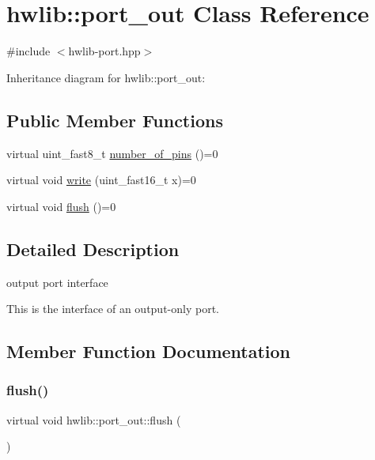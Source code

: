 \hypertarget{classhwlib_1_1port__out}{}\section{hwlib\+:\+:port\+\_\+out Class Reference}
\label{classhwlib_1_1port__out}


{\ttfamily \#include $<$hwlib-\/port.\+hpp$>$}



Inheritance diagram for hwlib\+:\+:port\+\_\+out\+:
\subsection*{Public Member Functions}
\begin{DoxyCompactItemize}
\item 
virtual uint\+\_\+fast8\+\_\+t \hyperlink{classhwlib_1_1port__out_a8593e2ff755b938797defb06c1e085df}{number\+\_\+of\+\_\+pins} ()=0
\item 
virtual void \hyperlink{classhwlib_1_1port__out_a3644bf484ebe059ec5bf17fa43e0c01b}{write} (uint\+\_\+fast16\+\_\+t x)=0
\item 
virtual void \hyperlink{classhwlib_1_1port__out_aff7c8d768ec0b7f3d738a47ef1a4bbfe}{flush} ()=0
\end{DoxyCompactItemize}


\subsection{Detailed Description}
output port interface

This is the interface of an output-\/only port. 

\subsection{Member Function Documentation}
\mbox{\label{classhwlib_1_1port__out_aff7c8d768ec0b7f3d738a47ef1a4bbfe}} 
\subsubsection{\texorpdfstring{flush()}{flush()}}
{\footnotesize\ttfamily virtual void hwlib\+::port\+\_\+out\+::flush (\begin{DoxyParamCaption}{ }\end{DoxyParamCaption})\hspace{0.3cm}{\ttfamily [pure virtual]}}





